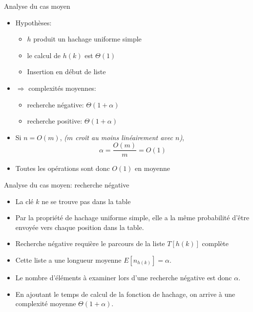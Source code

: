 \begin{frame}{Analyse du cas moyen}
\begin{itemize}
\item Hypothèses:
\begin{itemize}
\item $h$ produit un hachage uniforme simple
\item le calcul de $h(k)$ est $\Theta(1)$
\item Insertion en début de liste
\end{itemize}
\item $\Rightarrow$ complexités moyennes:
\begin{itemize}
\item recherche négative: $\Theta(1+\alpha)$
\item recherche positive: $\Theta(1+\alpha)$
\end{itemize}
\item Si $n=O(m)$, \hfill {\it ($m$ croît au moins linéairement avec $n$)}, $$\alpha=\frac{O(m)}{m}=O(1)$$
\item Toutes les opérations sont donc $O(1)$ en moyenne
\end{itemize}

\end{frame}

\begin{frame}{Analyse du cas moyen: recherche négative}
\begin{itemize}
\item La clé $k$ ne se trouve pas dans la table
\item Par la propriété de hachage uniforme simple, elle a la même probabilité d'être envoyée vers chaque position dans la table.
\item Recherche négative requière le parcours de la liste $T[h(k)]$ complète
\item Cette liste a une longueur moyenne $E[n_{h(k)}]=\alpha$.
\item Le nombre d'éléments à examiner lors d'une recherche négative est donc $\alpha$.
\item En ajoutant le temps de calcul de la fonction de hachage, on arrive à une complexité moyenne $\Theta(1+\alpha)$.
\end{itemize}
\end{frame}


